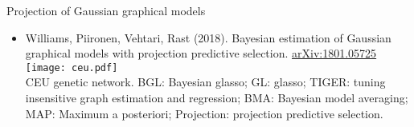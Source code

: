 \documentclass[english,t]{beamer}
\begin{document}
  




\begin{frame}
  
  {\Large\color{navyblue} Projection of Gaussian graphical models}\\

  \begin{itemize}
  \item Williams, Piironen, Vehtari, Rast (2018). Bayesian estimation of Gaussian graphical models with projection predictive selection. \href{https://arxiv.org/abs/1801.05725}{arXiv:1801.05725}\\
    \texttt{[image: ceu.pdf]}\\
    {\footnotesize CEU genetic network. BGL: Bayesian glasso; GL: glasso;
      TIGER: tuning insensitive graph estimation and regression; BMA:
      Bayesian model averaging; MAP: Maximum a posteriori; Projection:
      projection predictive selection.}
  \end{itemize}
  
\end{frame}
\end{document}
